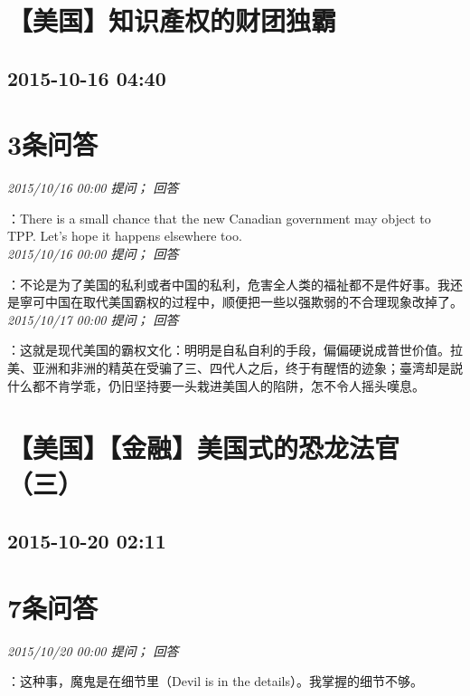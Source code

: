 \documentclass[twocolumn]{ctexart}
\begin{document}
\section{【美国】知识產权的财团独霸}
\subsection{2015-10-16 04:40}


\section{3条问答}

\textit{\hfill\noindent\small 2015/10/16 00:00 提问； 回答}

：There is a small chance that the new Canadian government may object to TPP. Let's hope it happens elsewhere too.\\

\textit{\hfill\noindent\small 2015/10/16 00:00 提问； 回答}

：不论是为了美国的私利或者中国的私利，危害全人类的福祉都不是件好事。我还是寧可中国在取代美国霸权的过程中，顺便把一些以强欺弱的不合理现象改掉了。\\

\textit{\hfill\noindent\small 2015/10/17 00:00 提问； 回答}

：这就是现代美国的霸权文化：明明是自私自利的手段，偏偏硬说成普世价值。拉美、亚洲和非洲的精英在受骗了三、四代人之后，终于有醒悟的迹象；臺湾却是説什么都不肯学乖，仍旧坚持要一头栽进美国人的陷阱，怎不令人摇头嘆息。\\


\section{【美国】【金融】美国式的恐龙法官（三）}
\subsection{2015-10-20 02:11}


\section{7条问答}

\textit{\hfill\noindent\small 2015/10/20 00:00 提问； 回答}

：这种事，魔鬼是在细节里（Devil is in the details）。我掌握的细节不够。\\
\end{document}
